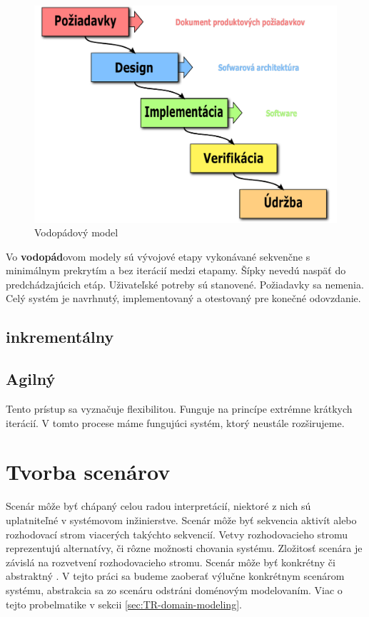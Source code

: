 \begin{figure}[H]
	\label{fig:waterfall_model}
	\centering
	\includegraphics[scale=0.5]{obrazky-figures/TR-waterfall-model}
	\caption{Vodopádový model}
\end{figure}

Vo \textbf{vodopád}ovom modely sú vývojové etapy vykonávané sekvenčne s minimálnym prekrytím a bez iterácií medzi etapamy. Šípky nevedú naspäť do predchádzajúcich etáp. Uživateľské potreby sú stanovené. Požiadavky sa nemenia. Celý systém je navrhnutý, implementovaný a otestovaný pre konečné odovzdanie.


\subsection{inkrementálny}

\subsection{Agilný}
Tento prístup sa vyznačuje flexibilitou. Funguje na princípe extrémne krátkych iterácií. V tomto procese máme fungujúci systém, ktorý neustále rozširujeme. 

\section{Tvorba scenárov} 

Scenár môže byť chápaný celou radou interpretácií, niektoré z nich sú uplatniteľné v systémovom inžinierstve. Scenár môže byť sekvencia aktivít alebo rozhodovací strom viacerých takýchto sekvencií. Vetvy rozhodovacieho stromu reprezentujú alternatívy, či rôzne možnosti chovania systému. Zložitosť scenára je závislá na rozvetvení rozhodovacieho stromu. Scenár môže byť konkrétny či abstraktný \cite{scenarios}. V tejto práci sa budeme zaoberať výlučne konkrétnym scenárom systému, abstrakcia sa zo scenáru odstráni doménovým modelovaním. Viac o tejto probelmatike v sekcii \ref{sec:TR-domain-modeling}.


